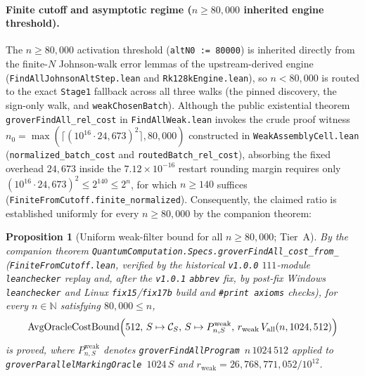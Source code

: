 \documentclass[11pt,a4paper]{article}
\newtheorem{proposition}[theorem]{Proposition}
\theoremstyle{definition}
\theoremstyle{remark}
\begin{document}
\paragraph{Finite cutoff and asymptotic regime (\(n \ge 80{,}000\) inherited engine threshold).}
The \(n \ge 80{,}000\) activation threshold (\texttt{altN0 := 80000}) is inherited directly from the finite-\(N\) Johnson-walk error lemmas of the upstream-derived engine (\texttt{FindAllJohnsonAltStep.lean} and \texttt{Rk128kEngine.lean}), so \(n < 80{,}000\) is routed to the exact \texttt{Stage1} fallback across all three walks (the pinned discovery, the sign-only walk, and \texttt{weakChosenBatch}). Although the public existential theorem \texttt{groverFindAll\_rel\_cost} in \texttt{FindAllWeak.lean} invokes the crude proof witness \(n_0 = \max(\lceil (10^{16}\cdot 24{,}673)^2\rceil, 80{,}000)\) constructed in \texttt{WeakAssemblyCell.lean} (\texttt{normalized\_batch\_cost} and \texttt{routedBatch\_rel\_cost}), absorbing the fixed overhead \(24{,}673\) inside the \(7.12 \times 10^{-16}\) restart rounding margin requires only \((10^{16}\cdot 24{,}673)^2 \le 2^{140} \le 2^n\), for which \(n \ge 140\) suffices (\texttt{FiniteFromCutoff.finite\_normalized}). Consequently, the claimed ratio is established uniformly for every \(n \ge 80{,}000\) by the companion theorem:

\begin{proposition}[Uniform weak-filter bound for all \(n \ge 80{,}000\); Tier~A]
\label{prop:findall-80000}
By the companion theorem \texttt{Quantum\allowbreak Computation.\allowbreak Specs.\allowbreak grover\allowbreak FindAll\_\allowbreak cost\_\allowbreak from\_} (\texttt{Finite\allowbreak FromCutoff.lean}, verified by the historical \texttt{v1.0.0} \(111\)-module \texttt{leanchecker} replay and, after the \texttt{v1.0.1} \texttt{abbrev} fix, by post-fix Windows \texttt{leanchecker} and Linux \texttt{fix15}/\texttt{fix17b} build and \texttt{\#print axioms} checks), for every \(n \in \mathbb{N}\) satisfying \(80{,}000 \le n\),
\[
  \operatorname{AvgOracleCostBound}\Bigl(512,\, S \mapsto \mathcal{C}_S,\, S \mapsto P^{\mathrm{weak}}_{n,S},\, r_{\mathrm{weak}}\,V_{\mathrm{all}}(n, 1024, 512)\Bigr)
\]
is proved, where \(P^{\mathrm{weak}}_{n,S}\) denotes \texttt{grover\allowbreak FindAll\allowbreak Program}~\(n\,1024\,512\) applied to \texttt{grover\allowbreak Parallel\allowbreak Marking\allowbreak Oracle}~\(1024\,S\) and \(r_{\mathrm{weak}} = 26{,}768{,}771{,}052 / 10^{12}\).
\end{proposition}
\end{document}
